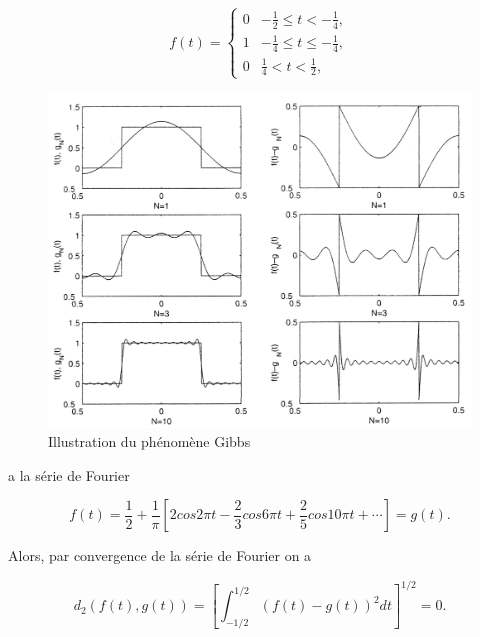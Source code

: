 \documentclass[10pt,twoside,a4paper]{book}
\begin{document}
\begin{enumerate}
  \begin{equation*}
    f(t) = \begin{cases} 0 & - \frac{1}{2} \leq t < - \frac{1}{4}, \\
      1 &  - \frac{1}{4} \leq t \leq - \frac{1}{4}, \\
      0 & \frac{1}{4} < t < \frac{1}{2},
          \end{cases}
  \end{equation*}


  \begin{figure}[h]
    \center
    \includegraphics[scale=0.5]{fig2.7}
    \caption{Illustration du phénomène Gibbs}
  \end{figure}

  \noindent
  a la série de Fourier

  \begin{equation}
    f(t) = \frac{1}{2} + \frac{1}{\pi}  \left[2cos2\pi t - \frac{2}{3}cos6\pi t + \frac{2}{5}cos10\pi t + \cdots \right] = g(t).
  \end{equation}

  \noindent
  Alors, par convergence de la série de Fourier on a

  \begin{equation*}
    d_2(f(t), g(t)) = \left[ \int_{-1/2}^{1/2} (f(t) - g(t))^2dt \right]^{1/2} = 0.
  \end{equation*}


\end{enumerate}
\end{document}
